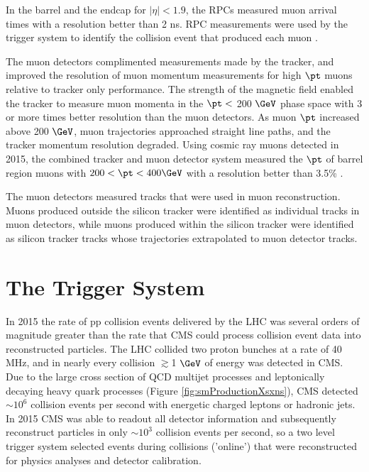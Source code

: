 In the barrel and the endcap for $|\eta| < 1.9$, the RPCs measured muon arrival times with a resolution better than 
2 ns.  RPC measurements were used by the trigger system to identify the collision event that produced each muon \cite{cmsMuonRecoRunTwo}.

The muon detectors complimented measurements made by the tracker, and improved the resolution of muon 
momentum measurements for high $\pt$ muons relative to tracker only performance.  The strength of the magnetic field 
enabled the tracker to measure muon momenta in the $\pt <$ 200 $\GeV$ phase space with 3 or more times better resolution 
than the muon detectors.  As muon $\pt$ increased above 200 $\GeV$, muon trajectories approached straight line paths, 
and the tracker momentum resolution degraded.  Using cosmic ray muons detected in 2015, the combined tracker and muon 
detector system measured the $\pt$ of barrel region muons with $200 < \pt < 400 \GeV$ with a resolution better than 
3.5\% \cite{cmsMuonRecoRunTwo}.

The muon detectors measured tracks that were used in muon reconstruction.  Muons produced outside the silicon tracker 
were identified as individual tracks in muon detectors, while muons produced within the silicon tracker were identified 
as silicon tracker tracks whose trajectories extrapolated to muon detector tracks.


\section{The Trigger System}
\label{sec:triggerDescription}
In 2015 the rate of pp collision events delivered by the LHC was several orders of magnitude greater than the 
rate that CMS could process collision event data into reconstructed particles.  The LHC collided two proton bunches 
at a rate of 40 MHz, and in nearly every collision $\gtrsim$1 $\GeV$ of energy was detected in CMS.  Due to the large cross 
section of QCD multijet processes and leptonically decaying heavy quark processes (Figure \ref{fig:smProductionXsxns}), CMS 
detected $\sim10^{6}$ collision events per second with energetic charged leptons or hadronic jets.  In 2015 
CMS was able to readout all detector information and subsequently reconstruct particles in only $\sim10^{3}$ 
collision events per second, so a two level trigger 
system selected events during collisions ('online') that were reconstructed for physics analyses and detector calibration.

